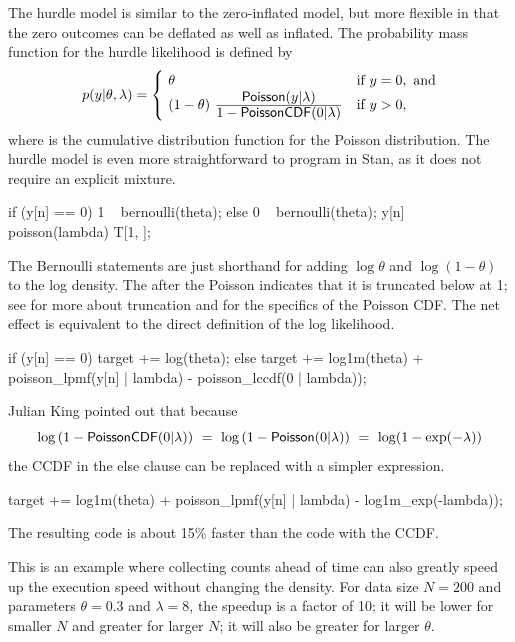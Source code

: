 The hurdle model is similar to the zero-inflated model, but more
flexible in that the zero outcomes can be deflated as well as
inflated.  The probability mass function for the hurdle likelihood is
defined by
%
\[
p(y|\theta,\lambda)
= 
\begin{cases}
\ \theta & \mbox{if } y = 0, \mbox{ and}
\\
\ (1 - \theta)
  \
   \frac{\displaystyle \distro{Poisson}(y | \lambda)}
        {\displaystyle \vspace*{8pt} 1 - \distro{PoissonCDF}(0 | \lambda)}
& \mbox{if } y > 0,
\end{cases}
\]
%
where  is the cumulative distribution function for
the Poisson distribution.  The hurdle model is even more straightforward to
program in Stan, as it does not require an explicit mixture.  
%
\begin{stancode}
   if (y[n] == 0)
      1 ~ bernoulli(theta);
    else {
      0 ~ bernoulli(theta);
      y[n] ~ poisson(lambda) T[1, ];
    }
\end{stancode}
%
The Bernoulli statements are just shorthand for adding $\log \theta$
and $\log (1 - \theta)$ to the log density.  The \code{T[1,]} after
the Poisson indicates that it is truncated below at 1; see
 for more about truncation and
 for the specifics of the Poisson CDF.  The net
effect is equivalent to the direct definition of the log likelihood.
%
\begin{stancode}
   if (y[n] == 0)
      target += log(theta);
    else
      target += log1m(theta) + poisson_lpmf(y[n] | lambda)
                - poisson_lccdf(0 | lambda));
\end{stancode}

Julian King pointed out that because
\[
\log \left( 1 - \distro{PoissonCDF}(0 | \lambda) \right)
\ = \ \log \left( 1 - \distro{Poisson}(0 | \lambda) \right) 
\ = \ \log(1 - \exp(-\lambda))
\]
the CCDF in the else clause can be replaced with a simpler expression.
%
\begin{stancode}
      target += log1m(theta) + poisson_lpmf(y[n] | lambda)
                - log1m_exp(-lambda));
\end{stancode}
%
The resulting code is about 15\% faster than the code with the CCDF.

This is an example where collecting counts ahead of time can also
greatly speed up the execution speed without changing the density.
For data size $N=200$ and parameters $\theta=0.3$ and $\lambda = 8$,
the speedup is a factor of 10; it will be lower for smaller $N$ and
greater for larger $N$; it will also be greater for larger $\theta$.

